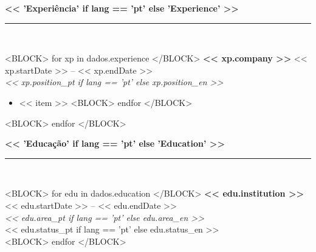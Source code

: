 \documentclass[10pt,a4paper]{article}
\begin{document}
\begin{minipage}[t]{0.63\textwidth}
    \raggedright
    
    {\color{primarycolor}\large \textbf{<< 'Experiência' if lang == 'pt' else 'Experience' >>}} \\
    \rule{\linewidth}{0.5pt} \\
    \vspace{2mm}
    
    <BLOCK> for xp in dados.experience </BLOCK>
        \textbf{<< xp.company >>} \hfill \small << xp.startDate >> -- << xp.endDate >> \\
        \textit{\small << xp.position_pt if lang == 'pt' else xp.position_en >>}
        \begin{itemize}
            <BLOCK> set destaques = xp.highlights_pt if lang == 'pt' else xp.highlights_en </BLOCK>
            <BLOCK> for item in destaques </BLOCK>
                \item \small << item >>
            <BLOCK> endfor </BLOCK>
        \end{itemize}
        \vspace{2mm}
    <BLOCK> endfor </BLOCK>
    
    \vspace{3mm}
    
    {\color{primarycolor}\large \textbf{<< 'Educação' if lang == 'pt' else 'Education' >>}} \\
    \rule{\linewidth}{0.5pt} \\
    \vspace{2mm}
    
    <BLOCK> for edu in dados.education </BLOCK>
        \textbf{<< edu.institution >>} \hfill \small << edu.startDate >> -- << edu.endDate >> \\
        \textit{\small << edu.area_pt if lang == 'pt' else edu.area_en >>} \\
        \small << edu.status_pt if lang == 'pt' else edu.status_en >> \\
        \vspace{2mm}
    <BLOCK> endfor </BLOCK>
\end{minipage}
\end{document}
